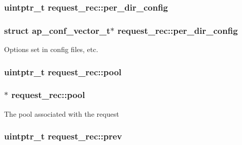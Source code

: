 \subsubsection[{\texorpdfstring{per\+\_\+dir\+\_\+config}{per_dir_config}}]{\setlength{\rightskip}{0pt plus 5cm}uintptr\+\_\+t request\+\_\+rec\+::per\+\_\+dir\+\_\+config}\hypertarget{structrequest__rec_a0935ac19a61c462c8986898b4c30547d}{}\label{structrequest__rec_a0935ac19a61c462c8986898b4c30547d}
\subsubsection[{\texorpdfstring{per\+\_\+dir\+\_\+config}{per_dir_config}}]{\setlength{\rightskip}{0pt plus 5cm}struct {\bf ap\+\_\+conf\+\_\+vector\+\_\+t}$\ast$ request\+\_\+rec\+::per\+\_\+dir\+\_\+config}\hypertarget{structrequest__rec_adf4465ec1d98a6517c13216b1f4d30f5}{}\label{structrequest__rec_adf4465ec1d98a6517c13216b1f4d30f5}
Options set in config files, etc. 
\subsubsection[{\texorpdfstring{pool}{pool}}]{\setlength{\rightskip}{0pt plus 5cm}uintptr\+\_\+t request\+\_\+rec\+::pool}\hypertarget{structrequest__rec_aa0a0c16f9a9ab3901cdb3f3c9c9d83d0}{}\label{structrequest__rec_aa0a0c16f9a9ab3901cdb3f3c9c9d83d0}
\subsubsection[{\texorpdfstring{pool}{pool}}]{$\ast$ request\+\_\+rec\+::pool}\hypertarget{structrequest__rec_a6b43edc6a8583d08944a736233838c24}{}\label{structrequest__rec_a6b43edc6a8583d08944a736233838c24}
The pool associated with the request 
\subsubsection[{\texorpdfstring{prev}{prev}}]{\setlength{\rightskip}{0pt plus 5cm}uintptr\+\_\+t request\+\_\+rec\+::prev}\hypertarget{structrequest__rec_af6094585f766a6a606b45a862254bd6e}{}\label{structrequest__rec_af6094585f766a6a606b45a862254bd6e}
